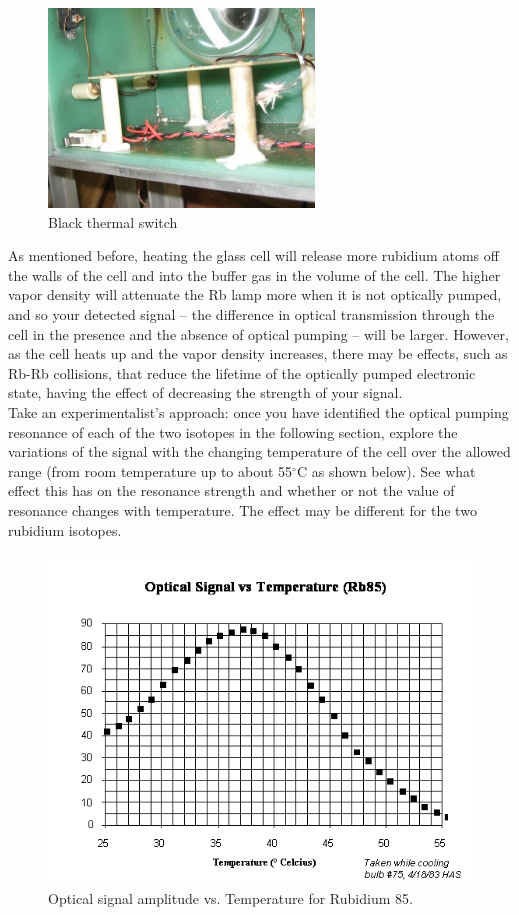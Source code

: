 \documentclass{../lab}
\begin{document}
    \begin{figure}[h!]
        \centering
        \includegraphics[width=0.6\linewidth]{images/IMG_4500}
        \caption{Black thermal switch}
    \end{figure}


As mentioned before, heating the glass cell will release more rubidium atoms off the walls of the cell and into the buffer gas in the volume of the cell. The higher vapor density will attenuate the Rb lamp more when it is not optically pumped, and so your detected signal -- the difference in optical transmission through the cell in the presence and the absence of optical pumping -- will be larger. However, as the cell heats up and the vapor density increases, there may be effects, such as Rb-Rb collisions, that reduce the lifetime of the optically pumped electronic state, having the effect of decreasing the strength of your signal. \\

Take an experimentalist's approach: once you have identified the optical pumping resonance of each of the two isotopes in the following section, explore the variations of the signal with the changing temperature of the cell over the allowed range (from room temperature up to about 55$^\circ$C as shown below). See what effect this has on the resonance strength and whether or not the value of resonance changes with temperature. The effect may be different for the two rubidium isotopes.

    \begin{figure}[h]
        \centering
        \includegraphics[width=0.8\linewidth]{images/SigVsTemp}
        \caption{Optical signal amplitude vs. Temperature for Rubidium 85.}
    \end{figure}
\end{document}
